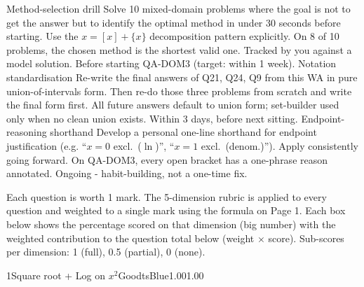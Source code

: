 \documentclass[11pt,a4paper]{article}
\begin{document}
\newpage


\begin{tsImprovements}
        {Method-selection drill}%
        {Solve 10 mixed-domain problems where the goal is not to get the answer but to identify the optimal method in under 30 seconds before starting. Use the $x = [x] + \{x\}$ decomposition pattern explicitly.}%
        {On 8 of 10 problems, the chosen method is the shortest valid one. Tracked by you against a model solution.}%
        {Before starting QA-DOM3 (target: within 1 week).}
        {Notation standardisation}%
        {Re-write the final answers of Q21, Q24, Q9 from this WA in pure union-of-intervals form. Then re-do those three problems from scratch and write the final form first.}%
        {All future answers default to union form; set-builder used only when no clean union exists.}%
        {Within 3 days, before next sitting.}
        {Endpoint-reasoning shorthand}%
        {Develop a personal one-line shorthand for endpoint justification (e.g. ``$x = 0$ excl.\ ($\ln$)'', ``$x = 1$ excl.\ (denom.)''). Apply consistently going forward.}%
        {On QA-DOM3, every open bracket has a one-phrase reason annotated.}%
        {Ongoing - habit-building, not a one-time fix.}
\end{tsImprovements}

\newpage


{\fontsize{9pt}{12pt}\selectfont\color{tsGrey} Each question is worth 1 mark. The 5-dimension rubric is applied to every question and weighted to a single mark using the formula on Page 1. Each box below shows the percentage scored on that dimension (big number) with the weighted contribution to the question total below (weight $\times$ score). Sub-scores per dimension: 1 (full), 0.5 (partial), 0 (none).}

\tsQAnswer{$x \in (-\infty, -1] \cup [1, \infty)$}{$x \in (-\infty, -1] \cup [1, \infty)$}
\begin{tsQCard}{1}{Square root + Log on $x^2$}{Good}{tsBlue}{1.00}{1.00}
\end{tsQCard}
\end{document}
